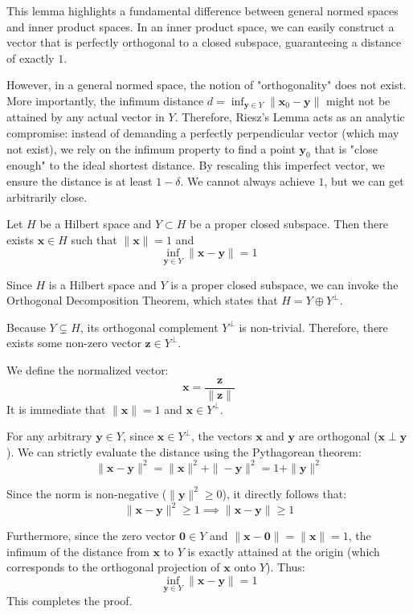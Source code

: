 \begin{remark}
    This lemma highlights a fundamental difference between general normed spaces and inner product spaces. In an inner product space, we can easily construct a vector that is perfectly orthogonal to a closed subspace, guaranteeing a distance of exactly $1$. 
    
    However, in a general normed space, the notion of "orthogonality" does not exist. More importantly, the infimum distance $d = \inf_{\mathbf{y} \in Y} \|\mathbf{x}_0 - \mathbf{y}\|$ might not be attained by any actual vector in $Y$. Therefore, Riesz's Lemma acts as an analytic compromise: instead of demanding a perfectly perpendicular vector (which may not exist), we rely on the infimum property to find a point $\mathbf{y}_0$ that is "close enough" to the ideal shortest distance. By rescaling this imperfect vector, we ensure the distance is at least $1 - \delta$. We cannot always achieve $1$, but we can get arbitrarily close.
\end{remark}

\vspace{1em} %

\begin{theorem}
    Let $H$ be a Hilbert space and $Y \subset H$ be a proper closed subspace. Then there exists $\mathbf{x} \in H$ such that $\|\mathbf{x}\| = 1$ and 
    \[ \inf_{\mathbf{y} \in Y} \|\mathbf{x} - \mathbf{y}\| = 1 \]
\end{theorem}

\begin{pfbox}
    Since $H$ is a Hilbert space and $Y$ is a proper closed subspace, we can invoke the Orthogonal Decomposition Theorem, which states that $H = Y \oplus Y^\perp$. 
    
    Because $Y \subsetneq H$, its orthogonal complement $Y^\perp$ is non-trivial. Therefore, there exists some non-zero vector $\mathbf{z} \in Y^\perp$.
    
    We define the normalized vector:
    \[ \mathbf{x} = \frac{\mathbf{z}}{\|\mathbf{z}\|} \]
    It is immediate that $\|\mathbf{x}\| = 1$ and $\mathbf{x} \in Y^\perp$.
    
    For any arbitrary $\mathbf{y} \in Y$, since $\mathbf{x} \in Y^\perp$, the vectors $\mathbf{x}$ and $\mathbf{y}$ are orthogonal ($\mathbf{x} \perp \mathbf{y}$). We can strictly evaluate the distance using the Pythagorean theorem:
    \[ \|\mathbf{x} - \mathbf{y}\|^2 = \|\mathbf{x}\|^2 + \|-\mathbf{y}\|^2 = 1 + \|\mathbf{y}\|^2 \]
    
    Since the norm is non-negative ($\|\mathbf{y}\|^2 \ge 0$), it directly follows that:
    \[ \|\mathbf{x} - \mathbf{y}\|^2 \ge 1 \implies \|\mathbf{x} - \mathbf{y}\| \ge 1 \]
    
    Furthermore, since the zero vector $\mathbf{0} \in Y$ and $\|\mathbf{x} - \mathbf{0}\| = \|\mathbf{x}\| = 1$, the infimum of the distance from $\mathbf{x}$ to $Y$ is exactly attained at the origin (which corresponds to the orthogonal projection of $\mathbf{x}$ onto $Y$). Thus:
    \[ \inf_{\mathbf{y} \in Y} \|\mathbf{x} - \mathbf{y}\| = 1 \]
    This completes the proof.
\end{pfbox}

